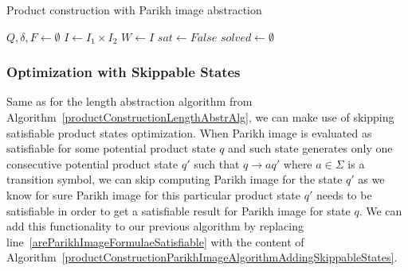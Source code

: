 \begin{algorithm}
\caption{Product construction with Parikh image abstraction}\label{productConstructionParikhImageAlgorithm}
%
\DontPrintSemicolon
{}
\BlankLine
$Q, \delta, F \gets \emptyset$ \;
$I \gets I_1 \times I_2$ \;
$W \gets I$ \;\label{work_set}
$sat \gets False$ \;\label{sat}
$solved \gets \emptyset$ \;\label{PIAlgorithm:solved}
\end{algorithm}\DecMargin{1em}

\subsubsection{Optimization with Skippable States}

Same as for the length abstraction algorithm from Algorithm~\ref{productConstructionLengthAbstrAlg}, we can make use of skipping satisfiable product states optimization. When Parikh image is evaluated as satisfiable for some potential product state $q$ and such state generates only one consecutive potential product state $q'$ such that $q \rightarrow{a} q'$ where $a \in \Sigma $ is a transition symbol, we can skip computing Parikh image for the state $q'$ as we know for sure Parikh image for this particular product state $q'$ needs to be satisfiable in order to get a satisfiable result for Parikh image for state $q$. We can add this functionality to our previous algorithm by replacing line~\ref{areParikhImageFormulaeSatisfiable} with the content of Algorithm~\ref{productConstructionParikhImageAlgorithmAddingSkippableStates}.

